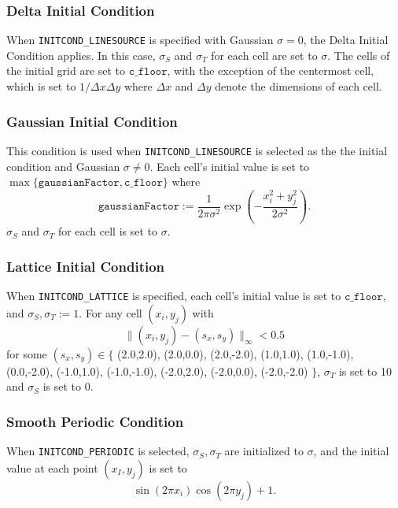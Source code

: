 \documentclass{article}
\newcommand{\floor}{\ensuremath{\mathtt{c\_floor}}\xspace}
\newcommand{\assign}{\ensuremath{\mathrel{\texttt{:=}}}}
\begin{document}
\subsubsection{Delta Initial Condition}
\label{init:delta}
When \texttt{INITCOND\_LINESOURCE} is specified with Gaussian $\sigma=0$, the
Delta Initial Condition applies. In this case, $\sigma_S$ and $\sigma_T$ for each
cell are set to $\sigma$. The cells of the initial grid are set to \floor,
with the exception of the centermost cell, %
which is set to $1 / \Delta x \Delta y$ where $\Delta x$ and $\Delta y$ denote the
dimensions of each cell.

\subsubsection{Gaussian Initial Condition}
\label{init:gauss}
This condition is used when \texttt{INITCOND\_LINESOURCE} is selected as the the
initial condition and Gaussian $\sigma \neq 0$. Each cell's initial value is
set to $\max \{\texttt{gaussianFactor}, \floor\}$ where
\begin{equation}
    \mathtt{gaussianFactor} \assign \frac{1}{2\pi\sigma^2}
        \exp \left(- \frac{x_i^2 + y_j^2}{2\sigma^2}\right).
\end{equation}
$\sigma_S$ and $\sigma_T$ for each cell is set to $\sigma$.

\subsubsection{Lattice Initial Condition}
\label{init:lattice}
When \texttt{INITCOND\_LATTICE} is specified, each cell's initial value is set to
\floor, and $\sigma_S,\sigma_T \assign 1$. For any cell $(x_i,y_j)$ with
\begin{equation}
    \|(x_i,y_j) - (s_x, s_y)\|_\infty < 0.5
\end{equation}    
for some $(s_x,s_y) \in \{$
    (2.0,2.0), (2.0,0.0), (2.0,-2.0), (1.0,1.0), (1.0,-1.0),
    (0.0,-2.0), (-1.0,1.0), (-1.0,-1.0), (-2.0,2.0), (-2.0,0.0), (-2.0,-2.0)
$\}$, $\sigma_T$ is set to 10 and $\sigma_S$ is set to 0.

\subsubsection{Smooth Periodic Condition}
\label{init:smooth}
When \texttt{INITCOND\_PERIODIC} is selected, $\sigma_S, \sigma_T$ are initialized
to $\sigma$, and the initial value at each point $(x_I,y_j)$ is set to
\begin{equation}
    \sin(2\pi x_i) \cos(2\pi y_j) + 1.
\end{equation}
\end{document}
